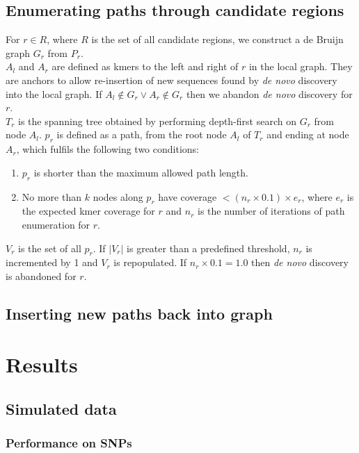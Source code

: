 \subsection{Enumerating paths through candidate regions}

For $r \in R$, where $R$ is the set of all candidate regions, we construct a de Bruijn graph $G_r$ from $P_r$. \\
$A_l$ and $A_r$ are defined as kmers to the left and right of $r$ in the local graph. They are anchors to allow re-insertion of new sequences found by \textit{de novo} discovery into the local graph. If $A_l \notin G_r \lor A_r \notin G_r$ then we abandon \textit{de novo} discovery for $r$. \\
$T_r$ is the spanning tree obtained by performing depth-first search on $G_r$ from node $A_l$. $p_r$ is defined as a path, from the root node $A_l$ of $T_r$ and ending at node $A_r$, which fulfils the following two conditions:

\begin{enumerate}
  \item $p_r$ is shorter than the maximum allowed path length.
  \item No more than $k$ nodes along $p_r$ have coverage $< (n_r \times 0.1) \times e_r$, where $e_r$ is the expected kmer coverage for $r$ and $n_r$ is the number of iterations of path enumeration for $r$.
\end{enumerate}

$V_r$ is the set of all $p_r$. If $|V_r|$ is greater than a predefined threshold, $n_r$ is incremented by 1 and $V_r$ is repopulated. If $n_r \times 0.1 = 1.0$ then \textit{de novo} discovery is abandoned for $r$.

\subsection{Inserting new paths back into graph}

\section{Results}
\label{section1.3}

\subsection{Simulated data}

\subsubsection{Performance on SNPs}

